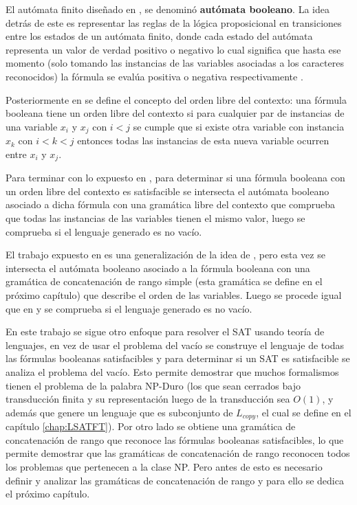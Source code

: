 \documentclass[12pt]{article}
\begin{document}
El autómata finito diseñado en \cite{aCFSAT}, se denominó \textbf{autómata booleano}. La idea detrás de este es representar 
las reglas de la lógica proposicional en transiciones entre los estados de un autómata finito, donde cada estado del autómata representa un valor de verdad positivo o 
negativo lo cual significa que hasta ese momento (solo tomando las instancias de las variables asociadas a los 
caracteres reconocidos) la fórmula se evalúa positiva o negativa respectivamente \cite{aCFSAT}.

Posteriormente en \cite{aCFSAT} se define el concepto del orden libre del contexto: una fórmula booleana tiene un orden libre del contexto si para cualquier par de instancias de una variable $x_i$ y $x_j$ con $i<j$ se
cumple que si existe otra variable con instancia $x_k$ con $i<k<j$ entonces todas las instancias de esta nueva
variable ocurren entre $x_i$ y $x_j$.

Para terminar con lo expuesto en \cite{aCFSAT}, para determinar si una fórmula booleana con un orden libre del contexto 
es satisfacible se intersecta el autómata booleano asociado a dicha fórmula con una gramática libre del contexto 
que comprueba que todas las instancias de las variables tienen el mismo valor, luego se comprueba si el lenguaje
generado es no vacío.

El trabajo expuesto en \cite{aSRCSAT} es una generalización de la idea de \cite{aCFSAT}, pero esta vez se intersecta
el autómata booleano asociado a la fórmula booleana con una gramática de concatenación de rango simple (esta gramática
se define en el próximo capítulo) que describe el orden de las variables. Luego se procede igual que en \cite{aCFSAT}
y se comprueba si el lenguaje generado es no vacío.

En este trabajo se sigue otro enfoque para resolver el SAT usando teoría de lenguajes, en vez de usar el problema
del vacío se construye el lenguaje de todas las fórmulas booleanas satisfacibles y para determinar si un SAT
es satisfacible se analiza el problema del vacío. Esto permite demostrar que muchos formalismos tienen el problema
de la palabra NP-Duro (los que sean cerrados bajo transducción finita y su representación luego de la transducción sea $O(1)$,
y además que genere un lenguaje que es subconjunto de $L_{copy}$, el cual se define en el capítulo \ref{chap:LSATFT}). Por otro lado se obtiene
una gramática de concatenación de rango que reconoce las fórmulas booleanas satisfacibles, lo que permite demostrar
que las gramáticas de concatenación de rango reconocen todos los problemas que pertenecen a la clase NP. Pero antes 
de esto es necesario definir y analizar las gramáticas de concatenación de rango y para ello se dedica el próximo capítulo.
\end{document}
